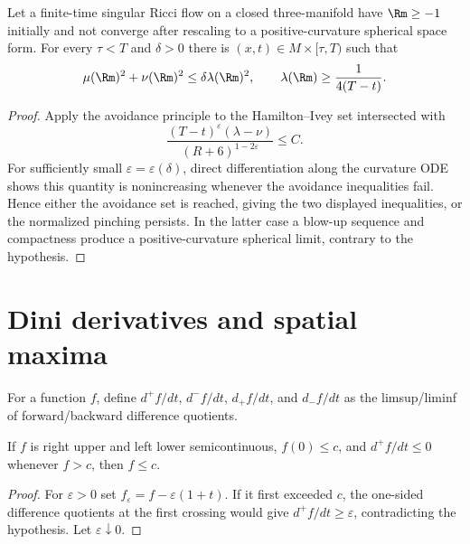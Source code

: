 \begin{theorem}
\label{thm:chow-ii-necklike-points}
Let a finite-time singular Ricci flow on a closed three-manifold have
$\Rm\ge-1$ initially and not converge after rescaling to a positive-curvature
spherical space form.  For every $\tau<T$ and $\delta>0$ there is
$(x,t)\in M\times[\tau,T)$ such that
\[
\mu(\Rm)^2+\nu(\Rm)^2\le\delta\lambda(\Rm)^2,
\qquad
\lambda(\Rm)\ge\frac1{4(T-t)}.
\]
\end{theorem}
\begin{proof}
\sketch
{}
Apply the avoidance principle to the Hamilton--Ivey set intersected with
\[
\frac{(T-t)^\varepsilon(\lambda-\nu)}{(R+6)^{1-2\varepsilon}}\le C.
\]
For sufficiently small $\varepsilon=\varepsilon(\delta)$, direct differentiation
along the curvature ODE shows this quantity is nonincreasing whenever the
avoidance inequalities fail.  Hence either the avoidance set is reached, giving
the two displayed inequalities, or the normalized pinching persists.  In the
latter case a blow-up sequence and compactness produce a positive-curvature
spherical limit, contrary to the hypothesis.
\end{proof}

\section{Dini derivatives and spatial maxima}

\begin{definition}
\label{def:chow-ii-dini-derivatives}
For a function $f$, define $d^+f/dt$, $d^-f/dt$, $d_+f/dt$, and $d_-f/dt$ as
the limsup/liminf of forward/backward difference quotients.
\end{definition}

\begin{lemma}
\label{lem:chow-ii-dini-upper-bound}
If $f$ is right upper and left lower semicontinuous, $f(0)\le c$, and
$d^+f/dt\le0$ whenever $f>c$, then $f\le c$.
\end{lemma}
\begin{proof}
\sketch
{}
For $\varepsilon>0$ set $f_\varepsilon=f-\varepsilon(1+t)$.  If it first exceeded
$c$, the one-sided difference quotients at the first crossing would give
$d^+f/dt\ge\varepsilon$, contradicting the hypothesis.  Let $\varepsilon\downarrow0$.
\end{proof}

